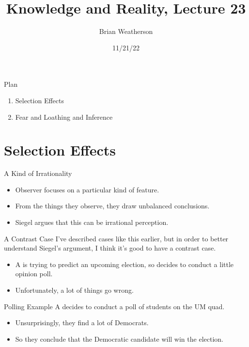 \documentclass[
  17pt,
  letterpaper,
  ignorenonframetext,
  aspectratio=169,
  xcolor={dvipsnames}]{beamer}
\title{Knowledge and Reality, Lecture 23}
\author{Brian Weatherson}
\date{11/21/22}
\providecommand{\tightlist}{%
  \setlength{\itemsep}{0pt}\setlength{\parskip}{0pt}}\usepackage{longtable,booktabs,array}
\begin{document}
\frame{\titlepage}
\ifdefined\Shaded\renewenvironment{Shaded}{\begin{tcolorbox}[frame hidden, boxrule=0pt, breakable, borderline west={3pt}{0pt}{shadecolor}, enhanced, interior hidden, sharp corners]}{\end{tcolorbox}}\fi

\begin{frame}{Plan}
\protect\hypertarget{plan}{}
\begin{enumerate}[<+->]
\tightlist
\item
  Selection Effects
\item
  Fear and Loathing and Inference
\end{enumerate}
\end{frame}

\hypertarget{selection-effects}{%
\section{Selection Effects}\label{selection-effects}}

\begin{frame}{A Kind of Irrationality}
\protect\hypertarget{a-kind-of-irrationality}{}
\begin{itemize}[<+->]
\tightlist
\item
  Observer focuses on a particular kind of feature.
\item
  From the things they observe, they draw unbalanced conclusions.
\item
  Siegel argues that this can be irrational perception.
\end{itemize}
\end{frame}

\begin{frame}{A Contrast Case}
\protect\hypertarget{a-contrast-case}{}
I've described cases like this earlier, but in order to better
understand Siegel's argument, I think it's good to have a contrast case.

\begin{itemize}[<+->]
\tightlist
\item
  A is trying to predict an upcoming election, so decides to conduct a
  little opinion poll.
\item
  Unfortunately, a lot of things go wrong.
\end{itemize}
\end{frame}

\begin{frame}{Polling Example}
\protect\hypertarget{polling-example}{}
A decides to conduct a poll of students on the UM quad.

\begin{itemize}[<+->]
\tightlist
\item
  Unsurprisingly, they find a lot of Democrats.
\item
  So they conclude that the Democratic candidate will win the election.
\end{itemize}
\end{frame}
\end{document}

